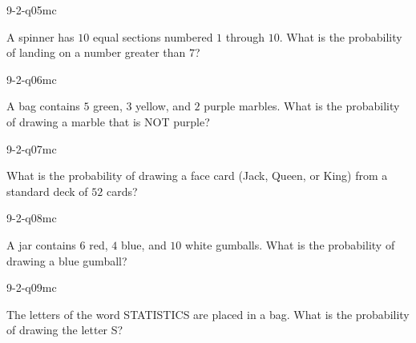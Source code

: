 \begin{practiceQuestion}{9-2-q05}{mc}
\begin{questionText}
A spinner has $10$ equal sections numbered $1$ through $10$. What is the probability of landing on a number greater than $7$?
\end{questionText}
\end{practiceQuestion}

\begin{practiceQuestion}{9-2-q06}{mc}
\begin{questionText}
A bag contains $5$ green, $3$ yellow, and $2$ purple marbles. What is the probability of drawing a marble that is NOT purple?
\end{questionText}
\end{practiceQuestion}

\begin{practiceQuestion}{9-2-q07}{mc}
\begin{questionText}
What is the probability of drawing a face card (Jack, Queen, or King) from a standard deck of $52$ cards?
\end{questionText}
\end{practiceQuestion}

\begin{practiceQuestion}{9-2-q08}{mc}
\begin{questionText}
A jar contains $6$ red, $4$ blue, and $10$ white gumballs. What is the probability of drawing a blue gumball?
\end{questionText}
\end{practiceQuestion}

\begin{practiceQuestion}{9-2-q09}{mc}
\begin{questionText}
The letters of the word STATISTICS are placed in a bag. What is the probability of drawing the letter S?
\end{questionText}
\end{practiceQuestion}

